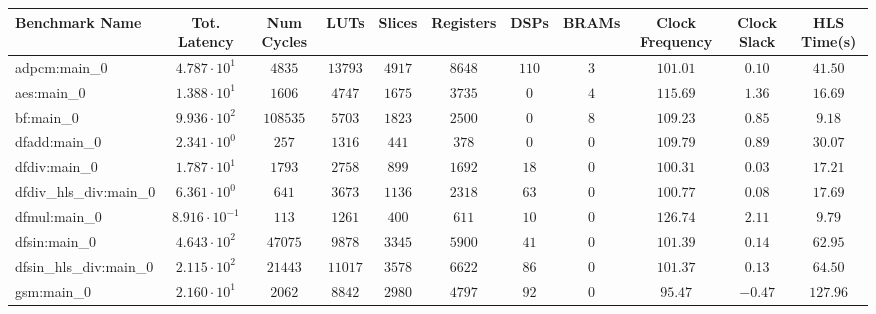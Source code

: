 \begin{tabular}{|l|c|c|c|c|c|c|c|c|c|c|}
\hline
Benchmark Name          & Tot. Latency            & Num Cycles & LUTs      & Slices    & Registers & DSPs    & BRAMs  & Clock Frequency & Clock Slack & HLS Time(s) \\
\hline
adpcm:main\_0           & $ 4.787 \cdot 10^{1}  $ & $ 4835   $ & $ 13793 $ & $ 4917  $ & $ 8648  $ & $ 110 $ & $ 3  $ & $ 101.01      $ & $ 0.10    $ & $ 41.50   $ \\
aes:main\_0             & $ 1.388 \cdot 10^{1}  $ & $ 1606   $ & $ 4747  $ & $ 1675  $ & $ 3735  $ & $ 0   $ & $ 4  $ & $ 115.69      $ & $ 1.36    $ & $ 16.69   $ \\
bf:main\_0              & $ 9.936 \cdot 10^{2}  $ & $ 108535 $ & $ 5703  $ & $ 1823  $ & $ 2500  $ & $ 0   $ & $ 8  $ & $ 109.23      $ & $ 0.85    $ & $ 9.18    $ \\
dfadd:main\_0           & $ 2.341 \cdot 10^{0}  $ & $ 257    $ & $ 1316  $ & $ 441   $ & $ 378   $ & $ 0   $ & $ 0  $ & $ 109.79      $ & $ 0.89    $ & $ 30.07   $ \\
dfdiv:main\_0           & $ 1.787 \cdot 10^{1}  $ & $ 1793   $ & $ 2758  $ & $ 899   $ & $ 1692  $ & $ 18  $ & $ 0  $ & $ 100.31      $ & $ 0.03    $ & $ 17.21   $ \\
dfdiv\_hls\_div:main\_0 & $ 6.361 \cdot 10^{0}  $ & $ 641    $ & $ 3673  $ & $ 1136  $ & $ 2318  $ & $ 63  $ & $ 0  $ & $ 100.77      $ & $ 0.08    $ & $ 17.69   $ \\
dfmul:main\_0           & $ 8.916 \cdot 10^{-1} $ & $ 113    $ & $ 1261  $ & $ 400   $ & $ 611   $ & $ 10  $ & $ 0  $ & $ 126.74      $ & $ 2.11    $ & $ 9.79    $ \\
dfsin:main\_0           & $ 4.643 \cdot 10^{2}  $ & $ 47075  $ & $ 9878  $ & $ 3345  $ & $ 5900  $ & $ 41  $ & $ 0  $ & $ 101.39      $ & $ 0.14    $ & $ 62.95   $ \\
dfsin\_hls\_div:main\_0 & $ 2.115 \cdot 10^{2}  $ & $ 21443  $ & $ 11017 $ & $ 3578  $ & $ 6622  $ & $ 86  $ & $ 0  $ & $ 101.37      $ & $ 0.13    $ & $ 64.50   $ \\
gsm:main\_0             & $ 2.160 \cdot 10^{1}  $ & $ 2062   $ & $ 8842  $ & $ 2980  $ & $ 4797  $ & $ 92  $ & $ 0  $ & $ 95.47       $ & $ -0.47   $ & $ 127.96  $ \\

\end{tabular}
